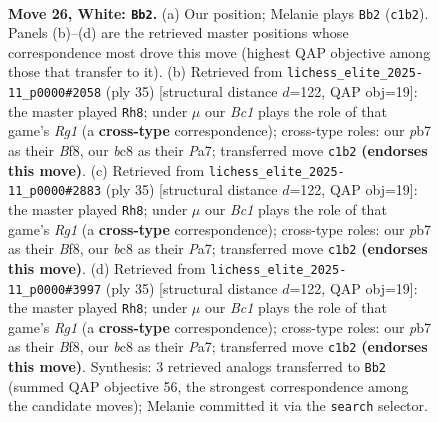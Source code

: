 \documentclass[11pt]{article}
\begin{document}
\clearpage

\begin{figure}[p]\centering
\begin{subfigure}{0.46\textwidth}\centering
\resizebox{\linewidth}{!}{%
\newchessgame
\chessboard[
  setfen={rnb5/1p1nb1k1/p3ppp1/3r3p/2N5/1P2P1P1/P1B1PK1P/R1B1R3 w - - 1 26},
  showmover=false,
  pgfstyle=straightmove, color=movearrow, markmove={c1-b2}
]}
\caption{}
\end{subfigure}\hfill
\begin{subfigure}{0.46\textwidth}\centering
\resizebox{\linewidth}{!}{%
\newchessgame
\chessboard[
  setfen={r1k1bbr1/p1p1n1p1/1pp5/4P2P/4N3/2N4R/PPP4P/R1B3K1 b - - 0 18},
  showmover=false,
  pgfstyle=straightmove, color=movearrow, markmove={g8-h8}
]}
\caption{}
\end{subfigure}
\\[4pt]
\begin{subfigure}{0.46\textwidth}\centering
\resizebox{\linewidth}{!}{%
\newchessgame
\chessboard[
  setfen={r1k1bbr1/p1p1n1p1/1pp5/4P2P/4N3/2N4R/PPP4P/R1B3K1 b - - 0 18},
  showmover=false,
  pgfstyle=straightmove, color=movearrow, markmove={g8-h8}
]}
\caption{}
\end{subfigure}\hfill
\begin{subfigure}{0.46\textwidth}\centering
\resizebox{\linewidth}{!}{%
\newchessgame
\chessboard[
  setfen={r1k1bbr1/p1p1n1p1/1pp5/4P2P/4N3/2N4R/PPP4P/R1B3K1 b - - 0 18},
  showmover=false,
  pgfstyle=straightmove, color=movearrow, markmove={g8-h8}
]}
\caption{}
\end{subfigure}
\caption{\textbf{Move 26, White: \texttt{Bb2}.} (a) Our position; Melanie plays \texttt{Bb2} (\texttt{c1b2}). Panels (b)--(d) are the retrieved master positions whose correspondence most drove this move (highest QAP objective among those that transfer to it). (b) Retrieved from \texttt{lichess\_elite\_2025-11\_p0000\#2058} (ply 35) [structural distance $d$=122, QAP obj=19]: the master played \texttt{Rh8}; under $\mu$ our \emph{Bc1} plays the role of that game's \emph{Rg1} (a \textbf{cross-type} correspondence); cross-type roles: our \emph{p}b7 as their \emph{B}f8, our \emph{b}c8 as their \emph{P}a7; transferred move \texttt{c1b2} \textbf{(endorses this move)}. (c) Retrieved from \texttt{lichess\_elite\_2025-11\_p0000\#2883} (ply 35) [structural distance $d$=122, QAP obj=19]: the master played \texttt{Rh8}; under $\mu$ our \emph{Bc1} plays the role of that game's \emph{Rg1} (a \textbf{cross-type} correspondence); cross-type roles: our \emph{p}b7 as their \emph{B}f8, our \emph{b}c8 as their \emph{P}a7; transferred move \texttt{c1b2} \textbf{(endorses this move)}. (d) Retrieved from \texttt{lichess\_elite\_2025-11\_p0000\#3997} (ply 35) [structural distance $d$=122, QAP obj=19]: the master played \texttt{Rh8}; under $\mu$ our \emph{Bc1} plays the role of that game's \emph{Rg1} (a \textbf{cross-type} correspondence); cross-type roles: our \emph{p}b7 as their \emph{B}f8, our \emph{b}c8 as their \emph{P}a7; transferred move \texttt{c1b2} \textbf{(endorses this move)}. Synthesis: 3 retrieved analogs transferred to \texttt{Bb2} (summed QAP objective 56, the strongest correspondence among the candidate moves); Melanie committed it via the \texttt{search} selector.}

\end{figure}
\end{document}
